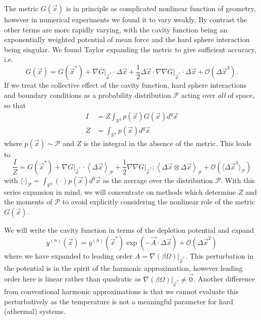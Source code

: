 \documentclass[11pt,twoside]{report}
\begin{document}
The metric $G(\vec{x})$ is in principle as complicated nonlinear function of geometry, however in numerical experiments we found it to vary weakly.
By contrast the other terms are more rapidly varying, with the cavity function being an exponentially weighted potential of mean force and the hard sphere interaction being singular.
We found Taylor expanding the metric to give sufficient accuracy, i.e.\
\begin{equation*}
  G(\vec{x})
  =
  G(\vec{x}^*)
  + \left. \nabla G \right|_{\vec{x}^*} \cdot \Delta \vec{x}
  + \frac{1}{2} \Delta\vec{x} \cdot \left. \nabla \nabla G \right|_{\vec{x}^*} \cdot \Delta\vec{x}
  + \mathcal{O}(\Delta\vec{x}^3).
\end{equation*}
If we treat the collective effect of the cavity function, hard sphere interactions and boundary conditions as a probability distribution $\mathcal{P}$ acting over \emph{all} of space, so that
\begin{subequations}
  \begin{align}
  I
  &=
  Z \int_{\mathbb{R}^q} p(\vec{x}) G(\vec{x}) d^q \vec{x}
  \\
  Z
  &=
  \int_{\mathbb{R}^q} p(\vec{x}) d^q \vec{x}
  \end{align}
\end{subequations}
where $p(\vec{x}) \sim \mathcal{P}$ and $Z$ is the integral in the absence of the metric.
This leads to
\begin{equation}
  \frac{I}{Z}
  =
  G(\vec{x}^*)
  + \left. \nabla G \right|_{\vec{x}^*} \cdot
  \left\langle \Delta \vec{x} \right\rangle_\mathcal{P}
  + \frac{1}{2} \left. \nabla \nabla G \right|_{\vec{x}^*} :
  \left\langle \Delta\vec{x} \otimes \Delta\vec{x} \right\rangle_\mathcal{P}
  + \mathcal{O}(\langle \Delta\vec{x}^3 \rangle_\mathcal{P})
\end{equation}
with $\langle \cdot \rangle_\mathcal{P} = \int_{\mathbb{R}^q} (\cdot) p(\vec{x}) d^q \vec{x}$ as the average over the distribution $\mathcal{P}$.
With this series expansion in mind, we will concentrate on methods which determine $Z$ and the moments of $\mathcal{P}$ to avoid explicitly considering the nonlinear role of the metric $G(\vec{x})$.

We will write the cavity function in terms of the depletion potential and expand
\begin{equation}
  y^{(n)}(\vec{x})
  =
  y^{(n)}(\vec{x}^*)
  \exp{\left( -\vec{A} \cdot \Delta \vec{x} \right)}
  + \mathcal{O}(\Delta \vec{x}^2)
\end{equation}
where we have expanded to leading order $A = \left. \nabla (\beta\Omega) \right|_{\vec{x}^*}$.
This perturbation in the potential is in the spirit of the harmonic approximation, however leading order here is linear rather than quadratic as $\left. \nabla (\beta\Omega) \right|_{\vec{x}^*} \ne \vec{0}$.
Another difference from conventional harmonic approximations is that we cannot evaluate this perturbatively as the temperature is not a meaningful parameter for hard (athermal) systems.
\end{document}
